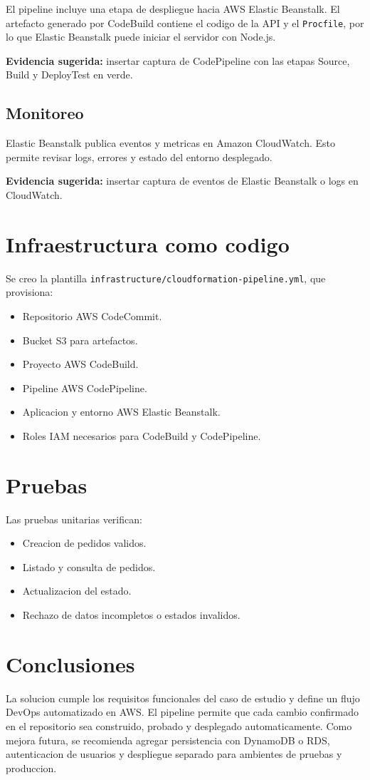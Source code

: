 \documentclass[12pt]{article}
\begin{document}
El pipeline incluye una etapa de despliegue hacia AWS Elastic Beanstalk. El artefacto generado por CodeBuild contiene el codigo de la API y el \texttt{Procfile}, por lo que Elastic Beanstalk puede iniciar el servidor con Node.js.

\textbf{Evidencia sugerida:} insertar captura de CodePipeline con las etapas Source, Build y DeployTest en verde.

\subsection{Monitoreo}

Elastic Beanstalk publica eventos y metricas en Amazon CloudWatch. Esto permite revisar logs, errores y estado del entorno desplegado.

\textbf{Evidencia sugerida:} insertar captura de eventos de Elastic Beanstalk o logs en CloudWatch.

\section{Infraestructura como codigo}

Se creo la plantilla \texttt{infrastructure/cloudformation-pipeline.yml}, que provisiona:

\begin{itemize}
  \item Repositorio AWS CodeCommit.
  \item Bucket S3 para artefactos.
  \item Proyecto AWS CodeBuild.
  \item Pipeline AWS CodePipeline.
  \item Aplicacion y entorno AWS Elastic Beanstalk.
  \item Roles IAM necesarios para CodeBuild y CodePipeline.
\end{itemize}

\section{Pruebas}

Las pruebas unitarias verifican:

\begin{itemize}
  \item Creacion de pedidos validos.
  \item Listado y consulta de pedidos.
  \item Actualizacion del estado.
  \item Rechazo de datos incompletos o estados invalidos.
\end{itemize}

\section{Conclusiones}

La solucion cumple los requisitos funcionales del caso de estudio y define un flujo DevOps automatizado en AWS. El pipeline permite que cada cambio confirmado en el repositorio sea construido, probado y desplegado automaticamente. Como mejora futura, se recomienda agregar persistencia con DynamoDB o RDS, autenticacion de usuarios y despliegue separado para ambientes de pruebas y produccion.
\end{document}
